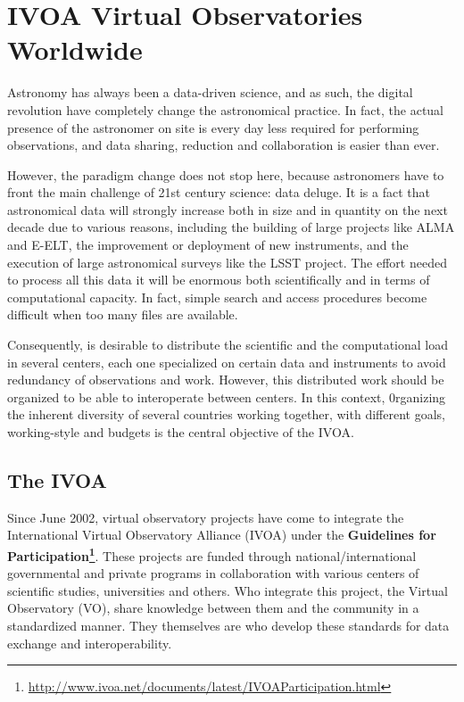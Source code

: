 \section{IVOA Virtual Observatories Worldwide}

Astronomy has always been a data-driven science, and as such, 
the digital revolution have completely change the astronomical practice.
In fact, the actual presence of the astronomer on site is every
day less required for performing observations, and data sharing, reduction
and collaboration is easier than ever. 

However, the paradigm change 
does not stop here, because astronomers have to front the main challenge of
21st century science: data deluge. It is a fact that astronomical data will
strongly increase both in size and in quantity on the next decade due to various
reasons, including the building of large projects like ALMA and E-ELT, 
the improvement or deployment of new instruments, and the execution of 
large astronomical surveys like the LSST project.
The effort needed to process all this data it will be enormous both
scientifically and in terms of computational capacity. 
In fact, simple search and access procedures become difficult
when too many files are available.

Consequently, is desirable to distribute the scientific and the computational 
load in several centers, each one specialized on certain data and instruments
to avoid redundancy of observations and work. However, this distributed work
should be organized to be able to interoperate between centers.
In this context, 0rganizing the inherent diversity of several countries working together, 
with different goals, working-style and budgets is the central objective of
the IVOA.


\subsection{The IVOA}

Since June 2002, virtual observatory projects have come to integrate the
International Virtual Observatory Alliance (IVOA) under the \textbf{Guidelines
for Participation\footnote{\url{http://www.ivoa.net/documents/latest/IVOAParticipation.html}}}. 
These projects are funded through national/international governmental and private programs in
collaboration with various centers of scientific studies, universities and
others. Who integrate this project, the Virtual Observatory (VO), share
knowledge between them and the community in a standardized manner. They
themselves are who develop these standards for data exchange and
interoperability. 

